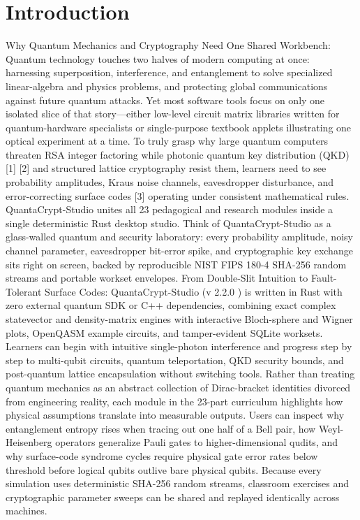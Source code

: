 \documentclass[10pt,letterpaper]{article}
\begin{document}
\section{Introduction}
Why Quantum Mechanics and Cryptography Need One Shared Workbench: Quantum technology touches two halves of modern computing at once: harnessing superposition, interference, and entanglement to solve specialized linear-algebra and physics problems, and protecting global communications against future quantum attacks. Yet most software tools focus on only one isolated slice of that story---either low-level circuit matrix libraries written for quantum-hardware specialists or single-purpose textbook applets illustrating one optical experiment at a time. To truly grasp why large quantum computers threaten RSA integer factoring while photonic quantum key distribution (QKD) [1] [2] and structured lattice cryptography resist them, learners need to see probability amplitudes, Kraus noise channels, eavesdropper disturbance, and error-correcting surface codes [3] operating under consistent mathematical rules. QuantaCrypt-Studio unites all 23 pedagogical and research modules inside a single deterministic Rust desktop studio. Think of QuantaCrypt-Studio as a glass-walled quantum and security laboratory: every probability amplitude, noisy channel parameter, eavesdropper bit-error spike, and cryptographic key exchange sits right on screen, backed by reproducible NIST FIPS 180-4 SHA-256 random streams and portable workset envelopes. From Double-Slit Intuition to Fault-Tolerant Surface Codes: QuantaCrypt-Studio (v 2.2.0 ) is written in Rust with zero external quantum SDK or C++ dependencies, combining exact complex statevector and density-matrix engines with interactive Bloch-sphere and Wigner plots, OpenQASM example circuits, and tamper-evident SQLite worksets. Learners can begin with intuitive single-photon interference and progress step by step to multi-qubit circuits, quantum teleportation, QKD security bounds, and post-quantum lattice encapsulation without switching tools. Rather than treating quantum mechanics as an abstract collection of Dirac-bracket identities divorced from engineering reality, each module in the 23-part curriculum highlights how physical assumptions translate into measurable outputs. Users can inspect why entanglement entropy rises when tracing out one half of a Bell pair, how Weyl-Heisenberg operators generalize Pauli gates to higher-dimensional qudits, and why surface-code syndrome cycles require physical gate error rates below threshold before logical qubits outlive bare physical qubits. Because every simulation uses deterministic SHA-256 random streams, classroom exercises and cryptographic parameter sweeps can be shared and replayed identically across machines.
\end{document}
